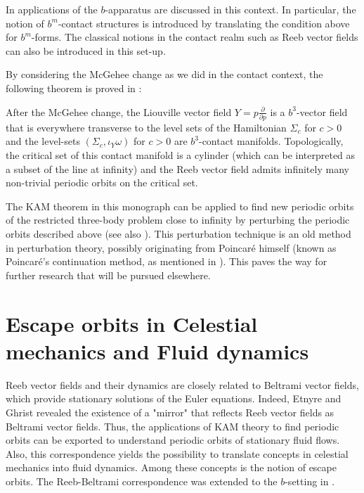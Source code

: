 In \cite{MO18, MO20}  applications of the $b$-apparatus are discussed in this context. In particular, the notion of $b^m$-contact structures is introduced by translating the condition above for $b^m$-forms. The classical notions in the contact realm such as  Reeb vector fields can also be introduced in this set-up.

By considering the McGehee change as we did in the contact context,  the following theorem is proved in \cite{MO20}:

\begin{theorem}\label{thm:bcontact3bp}
After the McGehee change, the Liouville vector field $Y=p\frac{\partial}{\partial p}$ is a $b^3$-vector field that is everywhere transverse to the level sets of the Hamiltonian $\Sigma_c$ for $c>0$ and the level-sets $(\Sigma_c,\iota_Y \omega)$ for $c>0$ are $b^3$-contact manifolds. Topologically, the critical set of this contact manifold is a cylinder (which can be interpreted as a subset of the line at infinity) and the Reeb vector field admits infinitely many non-trivial periodic orbits on the critical set.
\end{theorem}



The  KAM theorem in this monograph can be applied to find new periodic orbits of the restricted three-body problem close to infinity by perturbing the periodic orbits described above (see also \cite{MO20}).  This perturbation technique is an old method in perturbation theory, possibly originating from Poincaré himself (known as Poincaré's continuation method, as mentioned in \cite{meyeroffin}).  This paves the way for further research that will be pursued elsewhere.

\section{Escape orbits in Celestial mechanics and Fluid dynamics}
Reeb vector fields and their dynamics are closely related to Beltrami vector fields, which provide stationary solutions of the Euler equations. Indeed, Etnyre and Ghrist \cite{EG} revealed the existence of a "mirror" that reflects Reeb vector fields as Beltrami vector fields. Thus, the applications of KAM theory to find periodic orbits can be exported to understand periodic orbits of stationary fluid flows.  Also, this correspondence yields the possibility to translate concepts in celestial mechanics into  fluid dynamics. Among these concepts is the notion of escape orbits.
The Reeb-Beltrami correspondence was extended to the $b$-setting in \cite{danielevarobert}.

